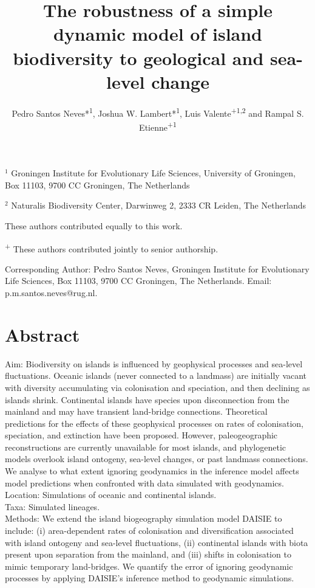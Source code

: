 \documentclass{article}
\title{The robustness of a simple dynamic model of island biodiversity to geological and sea-level change}
\author{Pedro Santos Neves*\textsuperscript{1}, Joshua W. Lambert*\textsuperscript{1}, Luis Valente\textsuperscript{+1,2} and Rampal S. Etienne\textsuperscript{+1}}
\date{}
\begin{document}
\maketitle

\noindent $^{1}$ Groningen Institute for Evolutionary Life Sciences, University of
Groningen, Box 11103, 9700 CC Groningen, The Netherlands

\noindent $^{2}$ Naturalis Biodiversity Center, Darwinweg 2, 2333 CR Leiden, The Netherlands 

\noindent * These authors contributed equally to this work.

\noindent \textsuperscript{+} These authors contributed jointly to senior authorship.

\noindent Corresponding Author: Pedro Santos Neves, Groningen Institute for Evolutionary Life Sciences, Box 11103, 9700 CC Groningen, The Netherlands. Email: p.m.santos.neves@rug.nl.

\section*{Abstract}

Aim: Biodiversity on islands is influenced by geophysical processes and sea-level fluctuations. Oceanic islands (never connected to a landmass) are initially vacant with diversity accumulating via colonisation and speciation, and then declining as islands shrink. Continental islands have species upon disconnection from the mainland and may have transient land-bridge connections. Theoretical predictions for the effects of these geophysical processes on rates of colonisation, speciation, and extinction have been proposed. However, paleogeographic reconstructions are currently unavailable for most islands, and phylogenetic models overlook island ontogeny, sea-level changes, or past landmass connections. We analyse to what extent ignoring geodynamics in the inference model affects model predictions when confronted with data simulated with geodynamics. \\

\noindent Location: Simulations of oceanic and continental islands. \\

\noindent Taxa: Simulated lineages. \\

\noindent Methods: We extend the island biogeography simulation model DAISIE to include: (i) area-dependent rates of colonisation and diversification associated with island ontogeny and sea-level fluctuations, (ii) continental islands with biota present upon separation from the mainland, and (iii) shifts in colonisation to mimic temporary land-bridges. We quantify the error of ignoring geodynamic processes by applying DAISIE’s inference method to geodynamic simulations. \\
\end{document}

